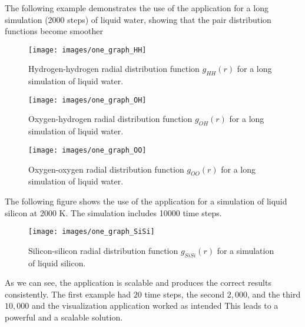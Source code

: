

The following example demonstrates the use of the application for a long simulation (2000 steps) of liquid water, showing that the pair distribution functions become smoother 

\begin{figure}[H]
\centering
\texttt{[image: images/one\_graph\_HH]}
\caption{Hydrogen-hydrogen radial distribution function $g_{HH}(r)$ for a long simulation of liquid water.}
\end{figure}

\begin{figure}[H]
\centering
\texttt{[image: images/one\_graph\_OH]}
\caption{Oxygen-hydrogen radial distribution function $g_{OH}(r)$ for a long simulation of liquid water.}
\end{figure}


\begin{figure}[H]
\centering
\texttt{[image: images/one\_graph\_OO]}
\caption{Oxygen-oxygen radial distribution function $g_{OO}(r)$ for a long simulation of liquid water.}
\end{figure}

The following figure shows the use of the application for a simulation of liquid silicon at 2000 K. The simulation includes 10000 time steps.

\begin{figure}[H]
\centering
\texttt{[image: images/one\_graph\_SiSi]}
\caption{Silicon-silicon radial distribution function $g_{SiSi}(r)$ for a simulation of liquid silicon.}
\end{figure}

As we can see, the application is scalable and produces the correct results consistently. The first example had $20$ time steps, the second $2,000$, and the third $10,000$ and the visualization application worked as intended This leads to a powerful and a scalable solution.
